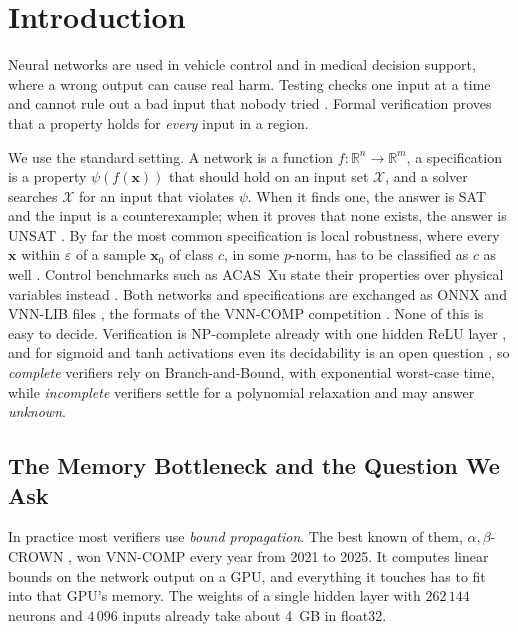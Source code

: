 \documentclass[runningheads]{llncs}
\begin{document}
\section{Introduction}
\label{sec:intro}

Neural networks are used in vehicle control and in medical decision support,
where a wrong output can cause real harm. Testing checks one input at a time
and cannot rule out a bad input that nobody tried \cite{Guidotti2019Enhancing}.
Formal verification proves that a property holds for \emph{every} input in a
region.

We use the standard setting. A network is a function
$f: \mathbb{R}^n \to \mathbb{R}^m$, a specification is a property
$\psi(f(\mathbf{x}))$ that should hold on an input set $\mathcal{X}$, and a
solver searches $\mathcal{X}$ for an input that violates $\psi$. When it finds
one, the answer is SAT and the input is a counterexample; when it proves that
none exists, the answer is UNSAT
\cite{marzari2025advancingneuralnetworkverification}. By far the most common
specification is local robustness, where every $\mathbf{x}$ within
$\varepsilon$ of a sample $\mathbf{x}_0$ of class $c$, in some $p$-norm, has to
be classified as $c$ as well \cite{DBLP:journals/corr/abs-2002-03339}. Control
benchmarks such as ACAS~Xu state their properties over physical variables
instead \cite{Demarchi2023SupportingStandardization}. Both networks and
specifications are exchanged as ONNX and VNN-LIB files \cite{VNNLIBWebsite},
the formats of the VNN-COMP competition
\cite{arXiv2212VNNCOMP2022,arXiv2312VNNCOMP2023,arXiv2412VNNCOMP2024,arXiv2512VNNCOMP2025}.
None of this is easy to decide. Verification is NP-complete already with one
hidden ReLU layer \cite{arXiv2403RobustnessVerification}, and for sigmoid and
tanh activations even its decidability is an open question
\cite{Isac2023ExpFunction}, so \emph{complete} verifiers rely on
Branch-and-Bound, with exponential worst-case time, while
\emph{incomplete} verifiers settle for a polynomial relaxation and may answer
\emph{unknown}.

\subsection{The Memory Bottleneck and the Question We Ask}

In practice most verifiers use \emph{bound propagation}. The best known of
them, $\alpha,\beta$-CROWN \cite{AlphaBetaCrownVNNCOMP23}, won VNN-COMP every
year from 2021 to 2025. It computes linear bounds on the network output on a
GPU, and everything it touches has to fit into that GPU's memory. The weights
of a single hidden layer with $262\,144$ neurons and $4\,096$ inputs already
take about 4~GB in float32.
\end{document}

